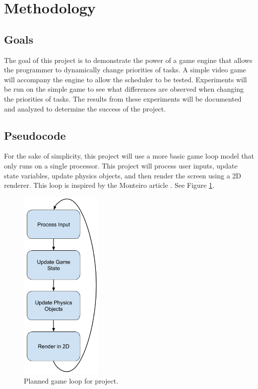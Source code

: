 \documentclass[a4paper, 12pt]{article}
\begin{document}
\section{Methodology}
    \subsection{Goals}

        The goal of this project is to demonstrate the power of a game engine that allows the programmer to dynamically change priorities of tasks. A simple video game will accompany the engine to allow the scheduler to be tested. Experiments will be run on the simple game to see what differences are observed when changing the priorities of tasks. The results from these experiments will be documented and analyzed to determine the success of the project. \\

    \subsection{Pseudocode}
        For the sake of simplicity, this project will use a more basic game loop model that only runs on a single processor. This project will process user inputs, update state variables, update physics objects, and then render the screen using a 2D renderer. This loop is inspired by the Monteiro article \cite{monteiro}. See Figure \ref{my_loop}.

        \begin{figure}[H]
            \includegraphics[width=4cm]{my_loop.png}
            \centering
            \caption{Planned game loop for project.}
            \label{my_loop}
        \end{figure}
\end{document}
